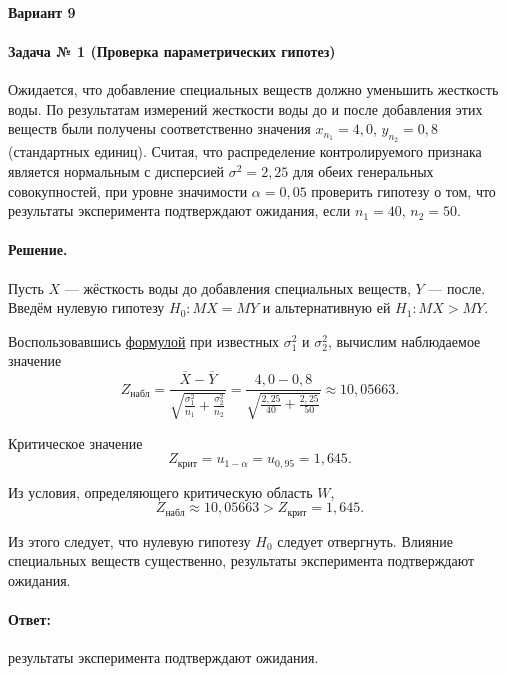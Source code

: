 \documentclass[a4paper,oneside,12pt]{extreport}
\begin{document}


\paragraph*{Вариант 9}

\paragraph{Задача № 1 (Проверка параметрических гипотез)}
Ожидается, что добавление специальных веществ должно уменьшить жесткость воды.
По результатам измерений жесткости воды до и после добавления этих веществ были получены соответственно значения $x_{n_1} = 4,0$, $y_{n_2} = 0,8$ (стандартных единиц).
Считая, что распределение контролируемого признака является нормальным с дисперсией $\sigma^2 = 2,25$ для обеих генеральных совокупностей, при уровне значимости $\alpha = 0,05$ проверить гипотезу о том, что результаты эксперимента подтверждают ожидания, если $n_1 = 40$, $n_2 = 50$.

\paragraph{Решение.}
Пусть $X$ — жёсткость воды до добавления специальных веществ, $Y$ — после.
Введём нулевую гипотезу $H_0: MX = MY$ и альтернативную ей $H_1: MX > MY$.

Воспользовавшись
\href{ftp://eufs.bmstu.ru/5c990f7e-bddb-11e6-9999-005056960017/06-05-2020-%D0%A8%D0%BF%D0%B0%D1%80%D0%B3%D0%B0%D0%BB%D0%BA%D0%B0.pdf}
{формулой}
при известных $\sigma_1^2$ и $\sigma_2^2$, вычислим наблюдаемое значение
\begin{equation}
	Z_{\text{набл}} = \frac{\overline X - \overline Y}{\sqrt{\frac{\sigma_1^2}{n_1}+\frac{\sigma_2^2}{n_2}}}
	                = \frac{4,0 - 0,8}{\sqrt{\frac{2,25}{40}+\frac{2,25}{50}}} \approx 10,05663.
\end{equation}

Критическое значение
\begin{equation}
	Z_{\text{крит}} = u_{1-\alpha} = u_{0,95} = 1,645.
\end{equation}

Из условия, определяющего критическую область $W$,
\begin{equation}
	Z_{\text{набл}} \approx 10,05663 > Z_{\text{крит}} = 1,645.
\end{equation}

Из этого следует, что нулевую гипотезу $H_0$ следует отвергнуть.
Влияние специальных веществ существенно, результаты эксперимента подтверждают ожидания.

\paragraph{Ответ:} результаты эксперимента подтверждают ожидания.
\end{document}
